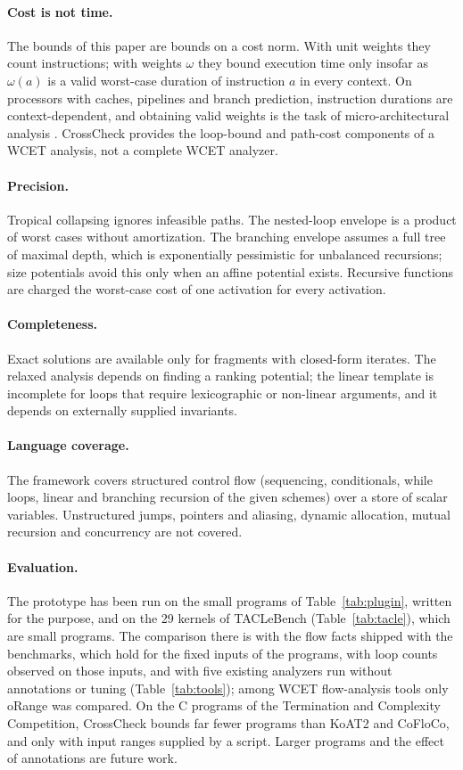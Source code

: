 \documentclass[oneside,english]{amsart}
\numberwithin{equation}{section}
\numberwithin{figure}{section}
\theoremstyle{plain}
\theoremstyle{definition}
\theoremstyle{plain}
\theoremstyle{remark}
\theoremstyle{plain}
\theoremstyle{definition}
\theoremstyle{plain}
\theoremstyle{remark}
\begin{document}
\paragraph{Cost is not time.}
The bounds of this paper are bounds on a cost norm. With unit weights they count instructions; with weights $\omega$ they bound execution time only insofar as $\omega(a)$ is a valid worst-case duration of instruction $a$ in every context. On processors with caches, pipelines and branch prediction, instruction durations are context-dependent, and obtaining valid weights is the task of micro-architectural analysis \cite{wilhelm2008worst}. CrossCheck provides the loop-bound and path-cost components of a WCET analysis, not a complete WCET analyzer.

\paragraph{Precision.}
Tropical collapsing ignores infeasible paths. The nested-loop envelope is a product of worst cases without amortization. The branching envelope assumes a full tree of maximal depth, which is exponentially pessimistic for unbalanced recursions; size potentials avoid this only when an affine potential exists. Recursive functions are charged the worst-case cost of one activation for every activation.

\paragraph{Completeness.}
Exact solutions are available only for fragments with closed-form iterates. The relaxed analysis depends on finding a ranking potential; the linear template is incomplete for loops that require lexicographic or non-linear arguments, and it depends on externally supplied invariants.

\paragraph{Language coverage.}
The framework covers structured control flow (sequencing, conditionals, while loops, linear and branching recursion of the given schemes) over a store of scalar variables. Unstructured jumps, pointers and aliasing, dynamic allocation, mutual recursion and concurrency are not covered.

\paragraph{Evaluation.}
The prototype has been run on the small programs of Table~\ref{tab:plugin}, written for the purpose, and on the 29 kernels of TACLeBench (Table~\ref{tab:tacle}), which are small programs. The comparison there is with the flow facts shipped with the benchmarks, which hold for the fixed inputs of the programs, with loop counts observed on those inputs, and with five existing analyzers run without annotations or tuning (Table~\ref{tab:tools}); among WCET flow-analysis tools only oRange was compared. On the C programs of the Termination and Complexity Competition, CrossCheck bounds far fewer programs than KoAT2 and CoFloCo, and only with input ranges supplied by a script. Larger programs and the effect of annotations are future work.
\end{document}
